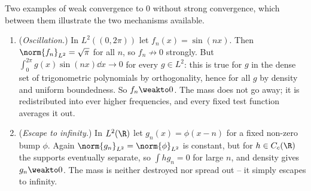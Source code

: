 \begin{example}\label{ex:weaknotstrong}
	Two examples of weak convergence to $0$ without strong convergence, which between them illustrate the two mechanisms available.
	\begin{enumerate}[label=(\roman*)]
		\item (\emph{Oscillation.}) In $L^2((0,2\pi))$ let $f_n(x) = \sin(nx)$. Then $\norm{f_n}_{L^2} = \sqrt\pi$ for all $n$, so $f_n \not\to 0$ strongly. But $\int_0^{2\pi} g(x)\sin(nx) \dd x \to 0$ for every $g \in L^2$: this is true for $g$ in the dense set of trigonometric polynomials by orthogonality, hence for all $g$ by density and uniform boundedness. So $f_n \weakto 0$. The mass does not go away; it is redistributed into ever higher frequencies, and every fixed test function averages it out.
		\item (\emph{Escape to infinity.}) In $L^2(\R)$ let $g_n(x) = \phi(x - n)$ for a fixed non-zero bump $\phi$. Again $\norm{g_n}_{L^2} = \norm{\phi}_{L^2}$ is constant, but for $h \in C_c(\R)$ the supports eventually separate, so $\int h g_n = 0$ for large $n$, and density gives $g_n \weakto 0$. The mass is neither destroyed nor spread out -- it simply escapes to infinity.
	\end{enumerate}
\begin{center}
\end{center}
\end{example}

